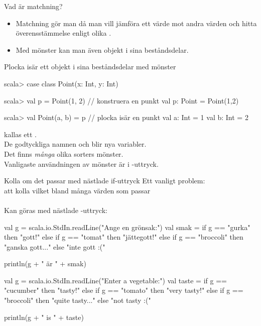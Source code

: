 \begin{Slide}{Vad är matchning?}

  \begin{itemize}
    \item Matchning gör man då man vill jämföra ett värde mot andra värden och hitta överensstämmelse  enligt olika .
    \item Med mönster kan man även  objekt i sina beståndsdelar.
  \end{itemize}
\end{Slide}

\begin{Slide}{Plocka isär ett objekt i sina beståndsdelar med mönster}

\begin{REPLnonum}
scala> case class Point(x: Int, y: Int)

scala> val p = Point(1, 2)      // konstruera en punkt
val p: Point = Point(1,2)
\end{REPLnonum}

\pause 

\begin{REPLnonum}
scala> val Point(a, b) = p      // plocka isär en punkt
val a: Int = 1
val b: Int = 2
\end{REPLnonum}
\pause {} kallas ett .\\ De godtyckliga namnen  och  blir nya variabler.\\ Det finns \emph{många} olika sorters mönster. \\
Vanligaste användningen av mönster är i -uttryck.
\end{Slide}


\begin{Slide}{Kolla om det passar med nästlade if-uttryck}
Ett vanligt problem: \\ att kolla vilket bland många värden som passar \\~\\

Kan göras med nästlade -uttryck:

\ifswedish
\begin{Code}
val g = scala.io.StdIn.readLine("Ange en grönsak:")
val smak =
  if      g == "gurka"    then "gott!"
  else if g == "tomat"    then "jättegott!"
  else if g == "broccoli" then "ganska gott..."
  else "inte gott :("

println(g + " är " + smak)
\end{Code}
\else
\begin{Code}
val g = scala.io.StdIn.readLine("Enter a vegetable:")
val taste =
  if      g == "cucumber"    then "tasty!"
  else if g == "tomato"    then "very tasty!"
  else if g == "broccoli" then "quite tasty..."
  else "not tasty :("

println(g + " is " + taste)
\end{Code}
\fi{}
      
\end{Slide}


